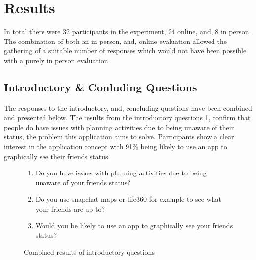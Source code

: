 \section{Results}
In total there were 32 participants in the experiment, 24 online, and, 8 in person. The combination of both an in person, and, online evaluation allowed the gathering of a suitable number of responses which would not have been possible with a purely in person evaluation.

\subsection{Introductory \& Conluding Questions}
The responses to the introductory, and, concluding questions have been combined and presented below. The results from the introductory questions \ref{fig:introAns}, confirm that people do have issues with planning activities due to being unaware of their status, the problem this application aims to solve. Participants show a clear interest in the application concept with 91\% being likely to use an app to graphically see their friends status. 

\begin{figure}[H]

\begin{enumerate}
    \item Do you have issues with planning activities due to being unaware of your friends status?
    \item Do you use snapchat maps or life360 for example to see what your friends are up to?
    \item Would you be likely to use an app to graphically see your friends status?
\end{enumerate}

\caption{Combined results of introductory questions}
\label{fig:introAns}
\end{figure}
\FloatBarrier

